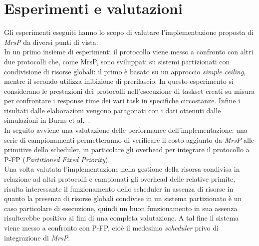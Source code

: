 










\section{Esperimenti e valutazioni}
\label{sec:esperimenti}

\noindent Gli esperimenti eseguiti hanno lo scopo di valutare l'implementazione proposta di \emph{MrsP} da diversi punti di vista.\\

\noindent In un primo insieme di esperimenti il protocollo viene messo a confronto con altri due protocolli che, come MrsP, sono sviluppati su sistemi partizionati con condivisione di risorse globali: il primo è basato su un approccio \textit{simple ceiling}, mentre il secondo utilizza inibizione di prerilascio. In questo esperimento si considerano le prestazioni dei protocolli nell'esecuzione di taskset creati su misura per confrontare i response time dei vari task in specifiche circostanze. Infine i risultati dalle elaborazioni vengono paragonati con i dati ottenuti dalle simulazioni in Burns et al.~\cite{Burns:2013:SCM:2547348.2547350}.\\

\noindent In seguito avviene una valutazione delle performance dell'implementazione: una serie di campionamenti permetteranno di verificare il costo aggiunto da \textit{MrsP} alle primitive dello scheduler, in particolare gli overhead per integrare il protocollo a P-FP (\textit{Partitioned Fixed Priority}).\\

\noindent Una volta valutata l'implementazione nella gestione della risorsa condivisa in relazione ad altri protocolli e campionati gli overhead delle relative primite, risulta interessante il funzionamento dello scheduler in assenza di risorse in quanto la presenza di risorse globali condivise in un sistema partizionato è un caso particolare di esecuzione, quindi un buon funzionamento in sua assenza risulterebbe positivo ai fini di una completa valutazione. A tal fine il sistema viene messo a confronto con P-FP, cioè il medesimo \textit{scheduler} privo di integrazione di \textit{MrsP}.\\

